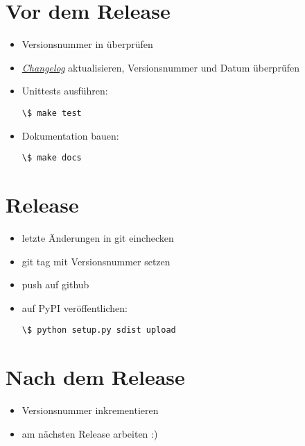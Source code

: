 \documentclass[a4paper,12pt,oneside]{sphinxmanual}
\begin{document}
\section{Vor dem Release}
\label{entwicklung:vor-dem-release}\begin{itemize}
\item {} 
Versionsnummer in  überprüfen

\item {} 
{\hyperref[changelog::doc]{\emph{Changelog}}} aktualisieren, Versionsnummer und Datum überprüfen

\item {} 
Unittests ausführen:

\begin{Verbatim}[commandchars=\\\{\}]
\$ make test
\end{Verbatim}

\item {} 
Dokumentation bauen:

\begin{Verbatim}[commandchars=\\\{\}]
\$ make docs
\end{Verbatim}

\end{itemize}


\section{Release}
\label{entwicklung:release}\begin{itemize}
\item {} 
letzte Änderungen in git einchecken

\item {} 
git tag mit Versionsnummer setzen

\item {} 
push auf github

\item {} 
auf PyPI veröffentlichen:

\begin{Verbatim}[commandchars=\\\{\}]
\$ python setup.py sdist upload
\end{Verbatim}

\end{itemize}


\section{Nach dem Release}
\label{entwicklung:nach-dem-release}\begin{itemize}
\item {} 
Versionsnummer inkrementieren

\item {} 
am nächsten Release arbeiten :)

\end{itemize}
\end{document}
